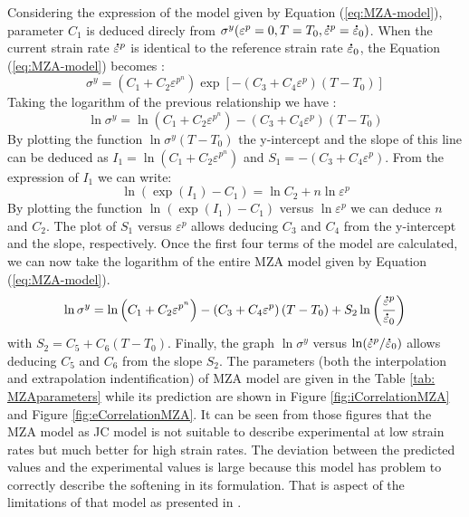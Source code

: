 \documentclass[twoside,english,1p,final,sort&compress]{elsarticle}
\theoremstyle{plain}
\newcommand{\mdot}[1]{\accentset{\mbox{\bfseries .}}{#1}}
\begin{document}
Considering the expression of the model given by Equation (\ref{eq:MZA-model}), parameter $C_1$ is deduced direcly from $\sigma^y(\varepsilon^p=0,T=T_0,\mdot{\varepsilon}^p=\mdot{\varepsilon}_0)$. When the current strain rate $\mdot{\varepsilon}^p$ is identical to the reference strain rate $\mdot{\varepsilon}_0$, the Equation (\ref{eq:MZA-model}) becomes :
\begin{equation}
\sigma^y = \left(C_{1}+C_{2}\varepsilon^{p^n}\right) \exp\left[-\left(C_{3}+C_{4}\varepsilon^p\right)\left(T-T_0\right)\right]
\end{equation}
Taking the logarithm of the previous relationship we have :
\begin{equation}
\ln\sigma^y = \ln\left(C_{1}+C_{2}\varepsilon^{p^n}\right)-\left(C_{3}+C_{4}\varepsilon^p\right)\left(T-T_0\right)
\end{equation}
By plotting the function $\ln\sigma^y\left(T-T_0\right)$ the y-intercept and the slope of this line can be deduced as $I_1=\ln\left(C_1+C_2\varepsilon^{p^n}\right)$ and $S_1=-\left(C_3+C_4\varepsilon^p\right)$.
From the expression of $I_1$ we can write:
\begin{equation}
\ln\left(\exp(I_1)-C_1\right) = \ln C_2+n\ln\varepsilon^p
\end{equation}
By plotting the function $\ln\left(\exp(I_1)-C_1\right)$ versus $\ln\varepsilon^p$ we can deduce $n$ and $C_2$. The plot of $S_1$ versus $\varepsilon^p$ allows deducing $C_3$ and $C_4$ from the y-intercept and the slope, respectively. Once the first four terms of the model are calculated, we can now take the logarithm of the entire MZA model given by Equation (\ref{eq:MZA-model}).
\begin{equation}
\ln\sigma^y = \ln\left(C_{1}+C_{2}\varepsilon^{p^n}\right) - \left(C_{3}+C_{4}\varepsilon^p\right)\left(T-T_0\right) + S_2\ln\left( \frac{\mdot{\varepsilon}^p}{\mdot{\varepsilon}_0}\right)
\end{equation}
with $S_2=C_5+C_6\left(T-T_0\right)$. Finally, the graph $\ln\sigma^y$ versus $ \ln(\mdot{\varepsilon}^p/\mdot{\varepsilon}_0)$ allows deducing $C_5$ and $C_6$ from the slope $S_2$. The parameters (both the interpolation and extrapolation indentification) of MZA model are given in the Table \ref{tab: MZAparameters} while its prediction are shown in Figure \ref{fig:iCorrelationMZA} and Figure \ref{fig:eCorrelationMZA}. It can be seen from those figures that the MZA model as JC model is not suitable to describe experimental at low strain rates but much better for high strain rates. The deviation between the predicted values and the experimental values is large because this model has problem to correctly describe the softening in its formulation. That is aspect of the limitations of that model as presented in \cite{tize2022generalized}.
\end{document}
